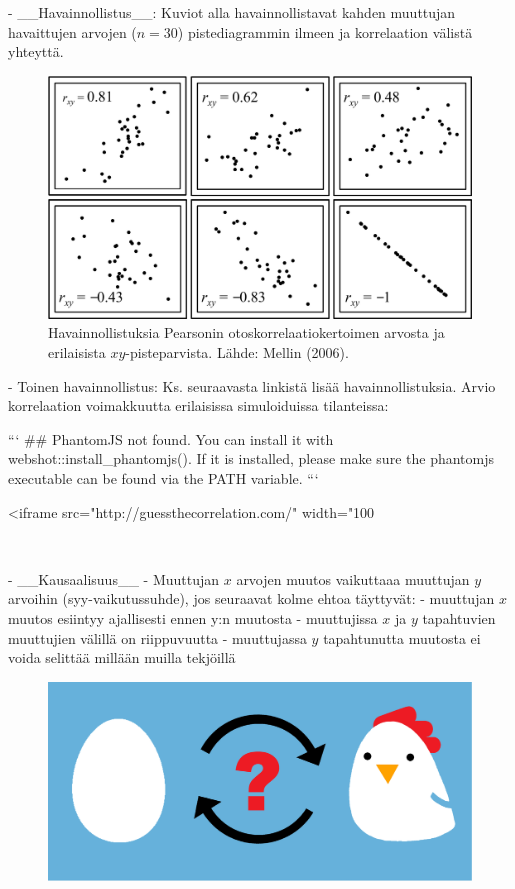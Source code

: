 \documentclass[
]{book}
\begin{document}
\begin{itemize}
- __Havainnollistus__: Kuviot alla havainnollistavat kahden muuttujan havaittujen arvojen ($n = 30$) pistediagrammin ilmeen ja korrelaation välistä yhteyttä.

\begin{figure}
\includegraphics[width=33.07in]{images/Pearson-korr-Mellin} \caption{Havainnollistuksia Pearsonin otoskorrelaatiokertoimen arvosta ja erilaisista $xy$-pisteparvista. Lähde: Mellin (2006).}\label{fig:unnamed-chunk-12}
\end{figure}

- Toinen havainnollistus: Ks. seuraavasta linkistä lisää havainnollistuksia. Arvio korrelaation voimakkuutta erilaisissa simuloiduissa tilanteissa: \url{}


```
## PhantomJS not found. You can install it with webshot::install_phantomjs(). If it is installed, please make sure the phantomjs executable can be found via the PATH variable.
```

<iframe src="http://guessthecorrelation.com/" width="100%

\
\

- __Kausaalisuus__
  - Muuttujan $x$ arvojen muutos vaikuttaaa muuttujan $y$ arvoihin (syy-vaikutussuhde), jos seuraavat kolme ehtoa täyttyvät:
    - muuttujan $x$ muutos esiintyy ajallisesti ennen y:n muutosta
    - muuttujissa $x$ ja $y$ tapahtuvien muuttujien välillä on riippuvuutta
    - muuttujassa $y$ tapahtunutta muutosta ei voida selittää millään muilla tekjöillä

\begin{figure}
\includegraphics[width=58.25in]{images/causality} \end{figure}


\end{itemize}
\end{document}

